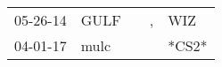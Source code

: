 \begin{supertabular}{p{0.07\textwidth}p{0.06\textwidth}p{0.02\textwidth}p{0.02\textwidth}p{0.06\textwidth}}
 05-26-14\textsuperscript{} &  GULF\textsuperscript{} &   &  , &  WIZ\textsuperscript{} \\
 04-01-17\textsuperscript{} &  mulc\textsuperscript{} &   &    &                  *CS2* \\
\end{supertabular}
